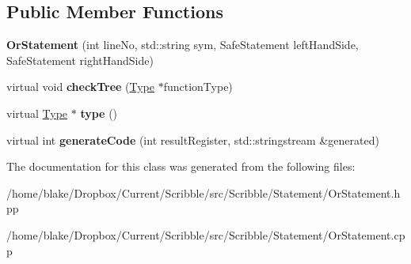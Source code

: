 \subsection*{Public Member Functions}
\begin{DoxyCompactItemize}
\item 
\hypertarget{class_scribble_core_1_1_or_statement_a4703fe908d4aa5df3a96854d40cd5179}{{\bfseries Or\-Statement} (int line\-No, std\-::string sym, Safe\-Statement left\-Hand\-Side, Safe\-Statement right\-Hand\-Side)}\label{class_scribble_core_1_1_or_statement_a4703fe908d4aa5df3a96854d40cd5179}

\item 
\hypertarget{class_scribble_core_1_1_or_statement_a8c61e63a836a6f6f3189e7fb19370c7a}{virtual void {\bfseries check\-Tree} (\hyperlink{class_scribble_core_1_1_type}{Type} $\ast$function\-Type)}\label{class_scribble_core_1_1_or_statement_a8c61e63a836a6f6f3189e7fb19370c7a}

\item 
\hypertarget{class_scribble_core_1_1_or_statement_a1b5189b085d975ed9f904a7307b912d1}{virtual \hyperlink{class_scribble_core_1_1_type}{Type} $\ast$ {\bfseries type} ()}\label{class_scribble_core_1_1_or_statement_a1b5189b085d975ed9f904a7307b912d1}

\item 
\hypertarget{class_scribble_core_1_1_or_statement_afabb7207c4594a8840403397de51e0c6}{virtual int {\bfseries generate\-Code} (int result\-Register, std\-::stringstream \&generated)}\label{class_scribble_core_1_1_or_statement_afabb7207c4594a8840403397de51e0c6}

\end{DoxyCompactItemize}


The documentation for this class was generated from the following files\-:\begin{DoxyCompactItemize}
\item 
/home/blake/\-Dropbox/\-Current/\-Scribble/src/\-Scribble/\-Statement/Or\-Statement.\-hpp\item 
/home/blake/\-Dropbox/\-Current/\-Scribble/src/\-Scribble/\-Statement/Or\-Statement.\-cpp\end{DoxyCompactItemize}
